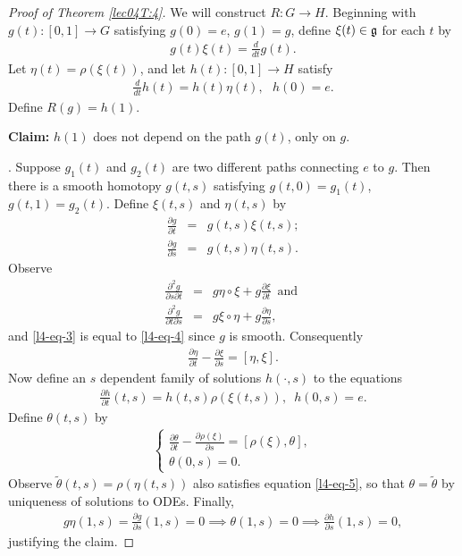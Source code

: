 \begin{proof}[Proof of Theorem \ref{lec04T:4}]
We will construct $R: G \to H$.  Beginning with $g(t): [0,1] \to G$ satisfying $g(0) =
e$, $g(1) = g$, define $\xi(t) \in \mathfrak{g}$ for each $t$ by
\begin{eqnarray*}
g(t) \xi(t) = \frac{d}{dt} g(t).
\end{eqnarray*}
Let $\eta(t) = \rho(\xi(t))$, and let $h(t):[0,1] \to H$ satisfy
\begin{eqnarray*}
\frac{d}{dt} h(t) = h(t) \eta(t), \,\,\,\, h(0) = e.
\end{eqnarray*}
Define $R(g) = h(1)$.

{\bf Claim:} $h(1)$ does not depend on the path $g(t)$, only on $g$.

.  Suppose $g_1(t)$ and $g_2(t)$ are two different paths
connecting $e$ to $g$.  Then there is a smooth homotopy $g(t,s)$ satisfying $g(t,0) =
g_1(t)$, $g(t,1) = g_2(t)$. Define $\xi(t,s)$ and $\eta(t,s)$ by
\begin{eqnarray*}
\frac{\partial g}{ \partial t} & = & g(t,s) \xi(t,s); \\
\frac{\partial g}{ \partial s} & = & g(t,s) \eta(t,s).
\end{eqnarray*}
Observe
\begin{eqnarray}
\frac{\partial^2 g}{ \partial s \partial t} & = & g \eta \circ \xi + g
\frac{\partial \xi }{\partial t} \,\,\, \text{and } \label{l4-eq-3}\\
\frac{\partial^2 g}{ \partial t \partial s} & = & g \xi \circ \eta + g \frac{\partial
\eta}{\partial s} \label{l4-eq-4},
\end{eqnarray}
and \eqref{l4-eq-3} is equal to \eqref{l4-eq-4} since $g$ is smooth. Consequently
\begin{eqnarray*}
\frac{\partial \eta}{\partial t} - \frac{\partial \xi}{ \partial s} =
     [ \eta, \xi ].
\end{eqnarray*}
Now define an $s$ dependent family of solutions $h(\cdot, s)$ to the equations
\begin{eqnarray*}
\frac{\partial h}{\partial t} (t,s) = h(t,s) \rho(\xi(t,s)), \,\,\, h(0,s) = e.
\end{eqnarray*}
Define $\theta(t,s)$ by
\begin{eqnarray}
\label{l4-eq-5} \left\{ \begin{array}{c} \displaystyle{\frac{\partial \theta}{\partial
t}} - \displaystyle{\frac{
    \partial \rho(\xi)}{\partial s}} = \left[ \rho(\xi), \theta
    \right], \\
  \theta(0,s) = 0. \end{array} \right.
\end{eqnarray}
Observe $\tilde{\theta}(t,s) = \rho(\eta(t,s))$ also satisfies equation
\eqref{l4-eq-5}, so that $\theta = \tilde{\theta}$ by uniqueness of solutions to ODEs.
Finally,
\begin{eqnarray*}
g \eta(1,s) = \frac{\partial g}{\partial s} (1,s) = 0 \implies \theta(1,s) = 0
\implies \frac{\partial h }{\partial s}(1,s) = 0,
\end{eqnarray*}
justifying the claim.


\end{proof}

